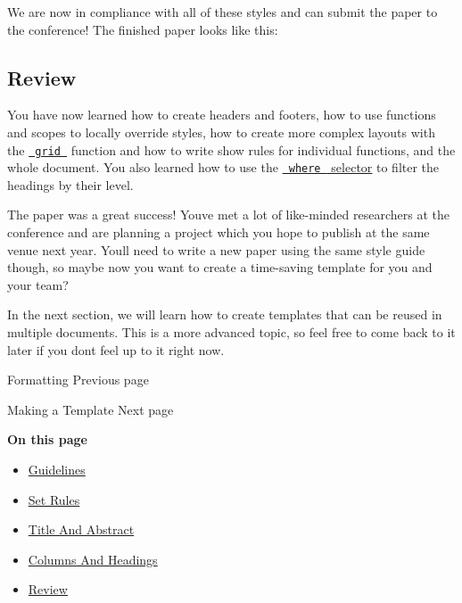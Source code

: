 We are now in compliance with all of these styles and can submit the
paper to the conference! The finished paper looks like this:


\subsection{Review}\label{review}

You have now learned how to create headers and footers, how to use
functions and scopes to locally override styles, how to create more
complex layouts with the
\href{/docs/reference/layout/grid/}{\texttt{\ grid\ }} function and how
to write show rules for individual functions, and the whole document.
You also learned how to use the
\href{/docs/reference/styling/\#show-rules}{\texttt{\ where\ } selector}
to filter the headings by their level.

The paper was a great success! You\textquotesingle ve met a lot of
like-minded researchers at the conference and are planning a project
which you hope to publish at the same venue next year.
You\textquotesingle ll need to write a new paper using the same style
guide though, so maybe now you want to create a time-saving template for
you and your team?

In the next section, we will learn how to create templates that can be
reused in multiple documents. This is a more advanced topic, so feel
free to come back to it later if you don\textquotesingle t feel up to it
right now.

\href{/docs/tutorial/formatting/}{\pandocbounded{}}

{ Formatting } { Previous page }

\href{/docs/tutorial/making-a-template/}{\pandocbounded{}}

{ Making a Template } { Next page }

\textbf{On this page}

\begin{itemize}
\tightlist
\item
  \hyperref[guidelines]{Guidelines}
\item
  \hyperref[set-rules]{Set Rules}
\item
  \hyperref[title-and-abstract]{Title And Abstract}
\item
  \hyperref[columns-and-headings]{Columns And Headings}
\item
  \hyperref[review]{Review}
\end{itemize}

